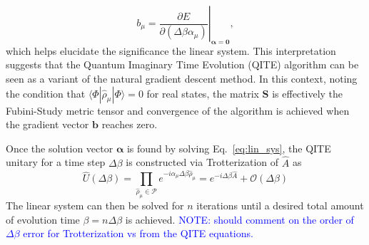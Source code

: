\documentclass[aip,jcp,amsmath,amssymb, reprint]{revtex4-1}
\begin{document}
\begin{equation}
b_\mu = \left. \frac{\partial E}{\partial (\Delta \beta \alpha_\mu)}  \right|_{\boldsymbol{\alpha} = \mathbf{0}},
\end{equation}
which helps elucidate the significance the linear system. 
This interpretation suggests that the Quantum Imaginary Time Evolution (QITE) algorithm can be seen as a variant of the natural gradient descent method. 
In this context, noting the condition that $\langle \Phi | \hat{\rho}_\mu | \Phi \rangle = 0$ for real states, the matrix $\mathbf{S}$ is effectively the Fubini-Study metric tensor \cite{stokes2020quantum, gacon2021simultaneous} and convergence of the algorithm is achieved when the gradient vector $\mathbf{b}$ reaches zero.

Once the solution vector $\boldsymbol{\alpha}$ is found by solving Eq.~\eqref{eq:lin_sys}, the QITE unitary for a time step $\Delta \beta$ is constructed via Trotterization of $\hat{A}$ as
\begin{equation}
\hat{U}(\Delta \beta) = \prod_{\hat{ \rho}_\mu \in \mathcal{P}} e^{-i \alpha_\mu \Delta \beta \hat{\rho}_\mu } 
= e^{-i\Delta \beta \hat{A}} + \mathcal{O}(\Delta \beta)
\end{equation}
The linear system can then be solved for $n$ iterations until a desired total amount of evolution time $\beta = n \Delta \beta$ is achieved.
\textcolor{blue}{NOTE: should comment on the order of $\Delta \beta$ error for Trotterization vs from the QITE equations.}
\end{document}
